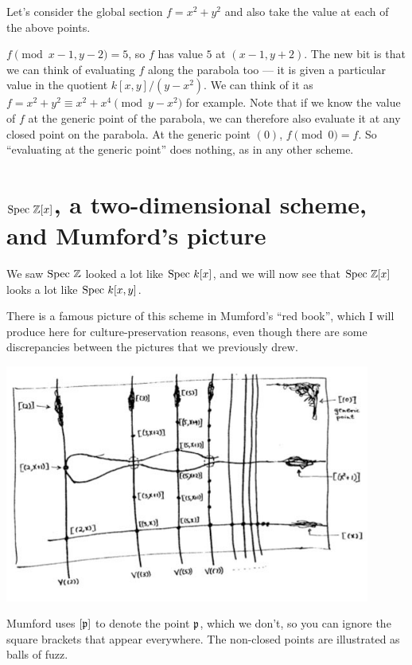 Let's consider the global section $f = x^2 + y^2$
and also take the value at each of the above points.
\begin{itemize}
	\ii $f \pmod{x-1,y-2} = 5$, so $f$ has value $5$ at $(x-1, y+2)$.
	\ii The new bit is that we can think of evaluating
	$f$ along the parabola too --- it is given a particular value
	in the quotient $k[x,y] / (y-x^2)$.
	We can think of it as $f = x^2+y^2 \equiv x^2+x^4 \pmod{y-x^2}$ for example.
	Note that if we know the value of $f$ at the generic point of the parabola,
	we can therefore also evaluate it at any closed point on the parabola.
	\ii At the generic point $(0)$, $f \pmod{0} = f$.
	So ``evaluating at the generic point'' does nothing, as in any other scheme.
\end{itemize}


\section{$\text{Spec } \mathbb Z[x]$, a two-dimensional scheme, and Mumford's picture}
We saw $\text{Spec } \mathbb Z$ looked a lot like $\text{Spec } k[x]$,
and we will now see that $\text{Spec } \mathbb Z[x]$ looks a lot like $\text{Spec } k[x,y]$.

There is a famous picture of this scheme in Mumford's ``red book'',
which I will produce here for culture-preservation reasons,
even though there are some discrepancies between
the pictures that we previously drew.
\begin{center}
	\includegraphics[width=0.9\textwidth]{media/mumforddrawing.jpg}
\end{center}
Mumford uses $[\mathfrak p]$ to denote the point $\mathfrak p$,
which we don't, so you can ignore the square brackets that appear everywhere.
The non-closed points are illustrated as balls of fuzz.


